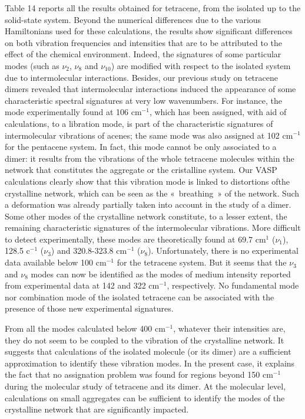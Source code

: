  Table 14 reports all the results obtained for tetracene, from the isolated up to the solid-state system. Beyond the numerical differences due to the various Hamiltonians used for these calculations, the results show significant differences on both vibration frequencies and intensities that are to be attributed to the effect of the chemical environment. Indeed, the signatures of some particular modes (such as $\nu_{2}$, $\nu_{8}$ and $\nu_{10}$) are modified with respect to the isolated system due to intermolecular interactions. Besides, our previous study on tetracene dimers revealed that intermolecular interactions induced the appearance of some characteristic spectral signatures at very low wavenumbers. For instance, the mode experimentally found at 106 cm$^{-1}$, which has been assigned, with aid of calculations, to a libration mode, is part of the characteristic signatures of intermolecular vibrations of acenes; the same mode was also assigned at 102 cm$^{-1}$ for the pentacene system. In fact, this mode cannot be only associated to a dimer: it results from the vibrations of the whole tetracene molecules within the network that constitutes the aggregate or the cristalline system. Our VASP calculations clearly show that this vibration mode is linked to distortions ofthe  crystalline network, which can be seen as the « breathing » of the network. Such a deformation was already partially taken into account in the study of a dimer. Some other modes of the crystalline network constitute, to a lesser extent, the remaining characteristic signatures of the intermolecular vibrations. More difficult to detect experimentally, these modes are theoretically found at 69.7 cm$^{1}$ ($\nu_{1}$), 128.5 c$^{-1}$ ($\nu_{3}$) and 320.8-323.8 cm$^{-1}$ ($\nu_{8}$). Unfortunately, there is no experimental data available below 100 cm$^{-1}$ for the tetracene system. But it seems that the $\nu_{3}$ and $\nu_{8}$ modes can now be identified as the modes of medium intensity reported from experimental data at 142 and 322 cm$^{-1}$, respectively. No fundamental mode nor combination mode of the isolated tetracene can be associated with the presence of those new experimental signatures.
 
 From all the modes calculated below 400 cm$^{-1}$, whatever their intensities are, they do not seem to be coupled to the vibration of the crystalline network. It suggests that calculations of the isolated molecule (or its dimer) are a sufficient approximation to identify these vibration modes. In the present case, it explains the fact that no assignation problem was found for regions beyond 150 cm$^{-1}$ during the molecular study of tetracene and its dimer. At the molecular level, calculations on small aggregates can be sufficient to identify the modes of the crystalline network that are significantly impacted. 
 
